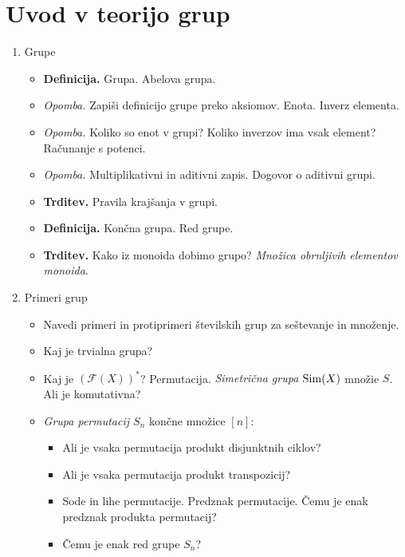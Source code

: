 \section{Uvod v teorijo grup}

\begin{enumerate}
    \item Grupe
    \begin{itemize}
        \item \colorbox{purple!30}{\textbf{Definicija.}} Grupa. Abelova grupa.
        \item \colorbox{yellow!30}{\emph{Opomba.}} Zapiši definicijo grupe preko aksiomov. Enota. Inverz elementa.
        \item \colorbox{yellow!30}{\emph{Opomba.}} Koliko so enot v grupi? Koliko inverzov ima vsak element? Računanje s potenci.
        \item \colorbox{yellow!30}{\emph{Opomba.}} Multiplikativni in aditivni zapis. Dogovor o aditivni grupi.
        \item \colorbox{blue!30}{\textbf{Trditev.}} Pravila krajšanja v grupi.
        \item \colorbox{purple!30}{\textbf{Definicija.}} Končna grupa. Red grupe.
        \item \colorbox{blue!30}{\textbf{Trditev.}} Kako iz monoida dobimo grupo? \emph{Množica obrnljivih elementov monoida}.    
    \end{itemize}
    \item Primeri grup
    \begin{itemize}
        \item Navedi primeri in protiprimeri številskih grup za seštevanje in množenje.
        \item Kaj je trvialna grupa?
        \item Kaj je $(\mathcal{F}(X))^*$? Permutacija. \emph{Simetrična grupa $\operatorname{Sim}(X)$} množie $S$. Ali je komutativna?
        \item \emph{Grupa permutacij $S_n$} končne množice $[n]$:
        \begin{itemize}
            \item Ali je vsaka permutacija produkt disjunktnih ciklov?
            \item Ali je vsaka permutacija produkt transpozicij?
            \item Sode in lihe permutacije. Predznak permutacije. Čemu je enak predznak produkta permutacij?
            \item Čemu je enak red grupe $S_n$?
        \end{itemize}

\end{itemize}
\end{enumerate}
